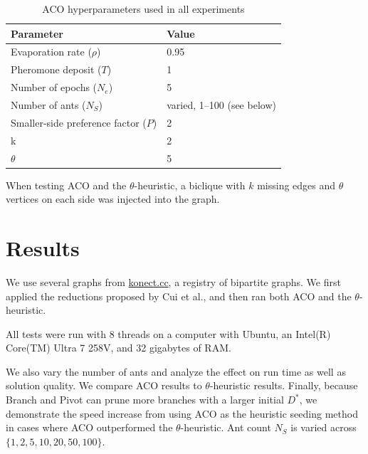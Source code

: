 \documentclass{article}
\begin{document}
\begin{table}[H]
    \centering
    \caption{ACO hyperparameters used in all experiments}
    \begin{tabular}{ll}
        \toprule
        Parameter & Value \\
        \midrule
        Evaporation rate ($\rho$) & 0.95 \\
        Pheromone deposit ($T$) & 1 \\
        Number of epochs ($N_e$) & 5 \\
        Number of ants ($N_S$) & varied, 1--100 (see below) \\
        Smaller-side preference factor ($P$) & 2 \\
        k & 2 \\
        $\theta$ & 5 \\
        \bottomrule
    \end{tabular}
\end{table}

When testing ACO and the $\theta$-heuristic, a biclique with $k$ missing edges and $\theta$ vertices on each side was injected into the graph.

\section{Results}

We use several graphs from \url{konect.cc}, a registry of bipartite graphs. We first applied the reductions proposed by Cui et al., and then ran both ACO and the $\theta$-heuristic.

All tests were run with 8 threads on a computer with Ubuntu, an Intel(R) Core(TM) Ultra 7 258V, and 32 gigabytes of RAM.

We also vary the number of ants and analyze the effect on run time as well as solution quality. We compare ACO results to $\theta$-heuristic results. Finally, because Branch and Pivot can prune more branches with a larger initial $D^*$, we demonstrate the speed increase from using ACO as the heuristic seeding method in cases where ACO outperformed the $\theta$-heuristic. Ant count $N_S$ is varied across $\{1, 2, 5, 10, 20, 50, 100\}$.
\end{document}
